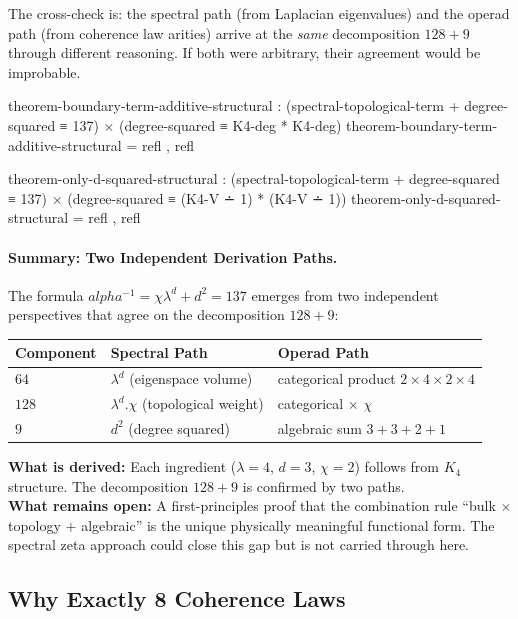 \documentclass[11pt,a4paper]{book}
\def\alpha{alpha}%
\def\cdot{.}%
\begin{document}
The cross-check is: the spectral path (from Laplacian eigenvalues) and the operad path
(from coherence law arities) arrive at the \emph{same} decomposition $128 + 9$ through
different reasoning. If both were arbitrary, their agreement would be improbable.

\begin{code}
theorem-boundary-term-additive-structural : 
  (spectral-topological-term + degree-squared ≡ 137) ×
  (degree-squared ≡ K4-deg * K4-deg)
theorem-boundary-term-additive-structural = refl , refl

theorem-only-d-squared-structural : 
  (spectral-topological-term + degree-squared ≡ 137) ×
  (degree-squared ≡ (K4-V ∸ 1) * (K4-V ∸ 1))
theorem-only-d-squared-structural = refl , refl
\end{code}

\paragraph{Summary: Two Independent Derivation Paths.}

The formula $\alpha^{-1} = \chi \lambda^d + d^2 = 137$ emerges from two
independent perspectives that agree on the decomposition $128 + 9$:

\begin{center}
\begin{tabular}{lll}
\hline
\textbf{Component} & \textbf{Spectral Path} & \textbf{Operad Path} \\
\hline
$64$  & $\lambda^d$ (eigenspace volume) & categorical product $2 \times 4 \times 2 \times 4$ \\
$128$ & $\lambda^d \cdot \chi$ (topological weight) & categorical $\times$ $\chi$ \\
$9$   & $d^2$ (degree squared) & algebraic sum $3 + 3 + 2 + 1$ \\
\hline
\end{tabular}
\end{center}

\noindent\textbf{What is derived:} Each ingredient ($\lambda = 4$, $d = 3$, $\chi = 2$)
follows from $K_4$ structure. The decomposition $128 + 9$ is confirmed by two paths.\\
\textbf{What remains open:} A first-principles proof that the combination rule
``bulk $\times$ topology $+$ algebraic'' is the unique physically meaningful
functional form. The spectral zeta approach could close this gap but is not
carried through here.

\subsection{Why Exactly 8 Coherence Laws}
\label{sec:why-8-laws}
\end{document}
